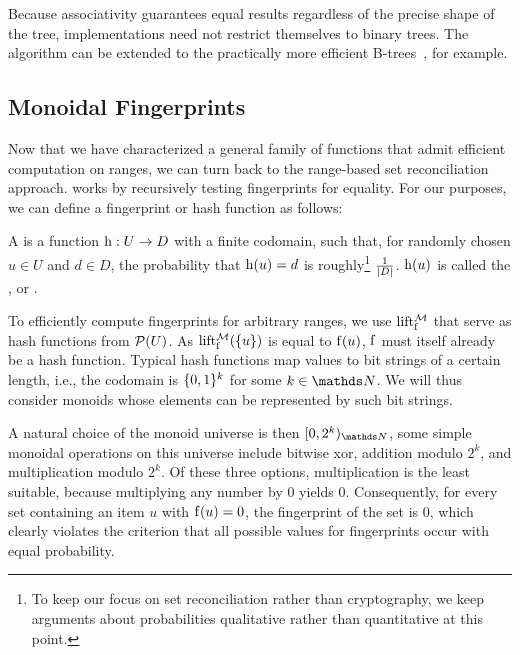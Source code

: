 \documentclass[conference]{IEEEtran}
\begin{document}
Because associativity guarantees equal results regardless of the precise shape of the tree, implementations need not restrict themselves to binary trees. The algorithm can be extended to the practically more efficient B-trees~\cite{bayer2002organization}, for example.

\subsection{Monoidal Fingerprints}

Now that we have characterized a general family of functions that admit efficient computation on ranges, we can turn back to the range-based set reconciliation approach.  works by recursively testing fingerprints for equality. For our purposes,
we can define a fingerprint or hash function as follows:

\begin{definition}
A  is a function ${\operatorname{h}}: {U} \rightarrow {D}$ with a finite codomain, such that, for randomly chosen $u \in U$ and $d \in D$, the probability that $\operatorname{h}(u) = d$ is roughly\footnote{To keep our focus on set reconciliation rather than cryptography, we keep arguments about probabilities qualitative rather than quantitative at this point.} $\frac{1}{|{D}|}$. $\operatorname{h}(u)$ is called the ,  or .
\end{definition}

To efficiently compute fingerprints for arbitrary ranges, we use \somewhatmorphisms{} $\operatorname{lift_{\operatorname{f}}^{\mathcal{M}}}$ that serve as hash functions from $\mathcal{P}({U})$. As $\operatorname{lift_{\operatorname{f}}^{\mathcal{M}}}(\{u\})$ is equal to $\operatorname{f}(u)$, $\operatorname{f}$ must itself already be a hash function. Typical hash functions map values to bit strings of a certain length, i.e., the codomain is $\{0, 1\}^k$ for some $k \in \N$. We will thus consider monoids whose elements can be represented by such bit strings.

A natural choice of the monoid universe is then $\range{0}{2^k}{\N}$, some simple monoidal operations on this universe include bitwise xor, addition modulo $2^k$, and multiplication modulo $2^k$. Of these three options, multiplication is the least suitable, because multiplying any number by $0$ yields $0$. Consequently, for every set containing an item $u$ with $\operatorname{f}(u) = 0$, the fingerprint of the set is $0$, which clearly violates the criterion that all possible values for fingerprints occur with equal probability.
\end{document}
